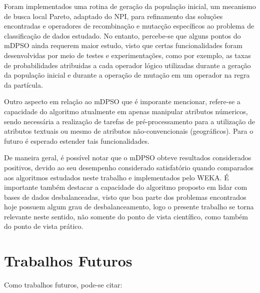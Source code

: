 \documentclass[
	12pt,				%
	openany,			%
	oneside,	
	a4paper,			%
	brazil,				%
	]{unimontes-ppgmsc-abntex2}
\begin{document}
Foram implementados uma rotina de geração da população inicial, um mecanismo de busca local Pareto, adaptado do NPI, para refinamento das soluções encontradas e operadores de recombinação e mutacção específicos ao problema de classificação de dados estudado. No entanto, percebe-se que alguns pontos do mDPSO ainda requerem maior estudo, visto que certas funcionalidades foram desenvolvidas por meio de testes e experimentações, como por exemplo, as taxas de probabilidades atribuidas a cada operador lógico utilizadas durante a geração da população inicial e durante a operação de mutação em um operador na regra da partícula. 

Outro aspecto em relação ao mDPSO que é imporante mencionar, refere-se a capacidade do algoritmo atualmente em apenas manipular atributos númericos, sendo necessária a realização de tarefas de pré-processamento para a utilização de atributos textuais ou mesmo de atributos não-convencionais (geográficos). Para o futuro é esperado estender tais funcionalidades.

De maneira geral, é possível notar que o mDPSO obteve resultados considerados positivos, devido ao seu desempenho considerado satisfatório quando comparados aos algoritmos estudados neste trabalho e implementados pelo WEKA. É importante também destacar a capacidade do algoritmo proposto em lidar com bases de dados desbalanceadas, visto que boa parte dos problemas encontrados hoje possuem algum grau de desbalanceamento, logo o presente trabalho se torna relevante neste sentido, não somente do ponto de vista científico, como também do ponto de vista prático.

\section{Trabalhos Futuros}

Como trabalhos futuros, pode-se citar:
\end{document}
